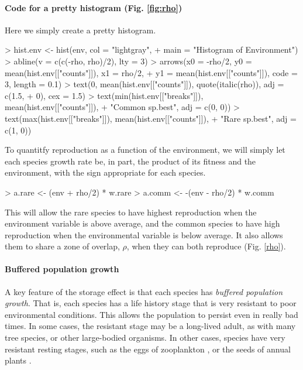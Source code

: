 \medskip \noindent
\begin{boxedminipage}{\linewidth}
  {\footnotesize
\paragraph{Code for a pretty histogram (Fig. \ref{fig:rho})} 
Here we simply create a pretty histogram.
\begin{Schunk}
\begin{Sinput}
> hist.env <- hist(env, col = "lightgray", 
+                  main = "Histogram of Environment")
> abline(v = c(c(-rho, rho)/2), lty = 3)
> arrows(x0 = -rho/2, y0 = mean(hist.env[["counts"]]), x1 = rho/2, 
+     y1 = mean(hist.env[["counts"]]), code = 3, length = 0.1)
> text(0, mean(hist.env[["counts"]]), quote(italic(rho)), adj = c(1.5, 
+     0), cex = 1.5)
> text(min(hist.env[["breaks"]]), mean(hist.env[["counts"]]), 
+     "Common sp.\ngrows best", adj = c(0, 0))
> text(max(hist.env[["breaks"]]), mean(hist.env[["counts"]]), 
+     "Rare sp.\ngrows best", adj = c(1, 0))
\end{Sinput}
\end{Schunk}
}
\end{boxedminipage} \medskip

To quantitfy reproduction as a function of the environment, we will simply let each species growth rate be, in part, the product of its fitness and the environment, with the sign appropriate for each species.
\begin{Schunk}
\begin{Sinput}
> a.rare <- (env + rho/2) * w.rare
> a.comm <- -(env - rho/2) * w.comm
\end{Sinput}
\end{Schunk}
This will allow the rare species to have highest reproduction when the environment variable is above average, and the common species to have high reproduction when the environmental variable is below average. It also allows them to share a zone of overlap, $\rho$, when they can both reproduce (Fig. \ref{rho}).

\paragraph{Buffered population growth}
A key feature of the storage effect is that each species has \emph{buffered population growth}. That is, each species has a life history stage that is very resistant to poor environmental conditions. This allows the population to persist even in really bad times. In some cases, the resistant stage may be a long-lived adult, as with many tree species, or other large-bodied organisms. In other cases, species have very resistant resting stages, such as the eggs of zooplankton \cite{Caceres:1997zv}, or the seeds of annual plants \cite{Facelli:2005kc}. 

